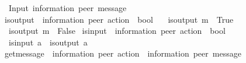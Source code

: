 \begin{isabellebody}
\ \ Input\ {\isachardoublequoteopen}{\isacharparenleft}{\kern0pt}{\isacharprime}{\kern0pt}information{\isacharcomma}{\kern0pt}\ {\isacharprime}{\kern0pt}peer{\isacharparenright}{\kern0pt}\ message{\isachardoublequoteclose}\ \ {\isacharparenleft}{\kern0pt}{\isachardoublequoteopen}{\isacharquery}{\kern0pt}{\isasymlangle}{\isacharunderscore}{\kern0pt}{\isasymrangle}{\isachardoublequoteclose}\ {\isacharbrackleft}{\kern0pt}{}{}{}{\isacharbrackright}{\kern0pt}\ {}{}{}{\isacharparenright}{\kern0pt}\isanewline
\isanewline
{}\isamarkupfalse%
\ is{\isacharunderscore}{\kern0pt}output\ {\isacharcolon}{\kern0pt}{\isacharcolon}{\kern0pt}\ {\isachardoublequoteopen}{\isacharparenleft}{\kern0pt}{\isacharprime}{\kern0pt}information{\isacharcomma}{\kern0pt}\ {\isacharprime}{\kern0pt}peer{\isacharparenright}{\kern0pt}\ action\ {\isasymRightarrow}\ bool{\isachardoublequoteclose}\ \isanewline
\ \ {\isachardoublequoteopen}is{\isacharunderscore}{\kern0pt}output\ {\isacharparenleft}{\kern0pt}{\isacharbang}{\kern0pt}{\isasymlangle}m{\isasymrangle}{\isacharparenright}{\kern0pt}\ {\isacharequal}{\kern0pt}\ True{\isachardoublequoteclose}\ {\isacharbar}{\kern0pt}\isanewline
\ \ {\isachardoublequoteopen}is{\isacharunderscore}{\kern0pt}output\ {\isacharparenleft}{\kern0pt}{\isacharquery}{\kern0pt}{\isasymlangle}m{\isasymrangle}{\isacharparenright}{\kern0pt}\ {\isacharequal}{\kern0pt}\ False{\isachardoublequoteclose}\isanewline
\isanewline
{}\isamarkupfalse%
\ is{\isacharunderscore}{\kern0pt}input\ {\isacharcolon}{\kern0pt}{\isacharcolon}{\kern0pt}\ {\isachardoublequoteopen}{\isacharparenleft}{\kern0pt}{\isacharprime}{\kern0pt}information{\isacharcomma}{\kern0pt}\ {\isacharprime}{\kern0pt}peer{\isacharparenright}{\kern0pt}\ action\ {\isasymRightarrow}\ bool{\isachardoublequoteclose}\ \isanewline
\ \ {\isachardoublequoteopen}is{\isacharunderscore}{\kern0pt}input\ a\ {\isasymequiv}\ {\isasymnot}{\isacharparenleft}{\kern0pt}is{\isacharunderscore}{\kern0pt}output\ a{\isacharparenright}{\kern0pt}{\isachardoublequoteclose}\isanewline
\isanewline
{}\isamarkupfalse%
\ get{\isacharunderscore}{\kern0pt}message\ {\isacharcolon}{\kern0pt}{\isacharcolon}{\kern0pt}\ {\isachardoublequoteopen}{\isacharparenleft}{\kern0pt}{\isacharprime}{\kern0pt}information{\isacharcomma}{\kern0pt}\ {\isacharprime}{\kern0pt}peer{\isacharparenright}{\kern0pt}\ action\ {\isasymRightarrow}\ {\isacharparenleft}{\kern0pt}{\isacharprime}{\kern0pt}information{\isacharcomma}{\kern0pt}\ {\isacharprime}{\kern0pt}peer{\isacharparenright}{\kern0pt}\ message{\isachardoublequoteclose}\ \isanewline

\end{isabellebody}
